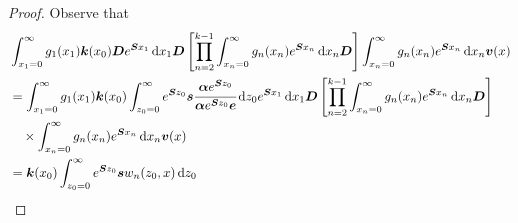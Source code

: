 \begin{proof}
	Observe that 
	\begin{align}
		\nonumber&\int_{x_1=0}^\infty g_1(x_1) \boldsymbol k(x_0) \boldsymbol D e^{\boldsymbol{S}x_1}\, \mathrm{d} x_1\boldsymbol D 
            	\left[\prod_{n=2}^{k-1}\int_{x_n=0}^\infty g_n(x_n) e^{\boldsymbol{S}x_n} \, \mathrm{d} x_n
		\boldsymbol D\right]
            	\int_{x_n=0}^\infty g_{n}(x_n) e^{\boldsymbol{S}x_n} \, \mathrm{d} x_n {\boldsymbol v}(x) 
		\\\nonumber&=\int_{x_1=0}^\infty g_1(x_1) \boldsymbol k(x_0) \int_{z_0=0}^\infty e^{\boldsymbol Sz_0}\boldsymbol s\cfrac{\boldsymbol\alpha e^{\boldsymbol Sz_0}}{\boldsymbol\alpha e^{\boldsymbol Sz_0}\boldsymbol e} \, \mathrm{d} z_0 e^{\boldsymbol{S}x_1}\, \mathrm{d} x_1\boldsymbol D 
            	\left[\prod_{n=2}^{k-1}\int_{x_n=0}^\infty g_n(x_n) e^{\boldsymbol{S}x_n} \, \mathrm{d} x_n
		\boldsymbol D\right]
            	\\\nonumber&\quad\times\int_{x_n=0}^\infty g_{n}(x_n) e^{\boldsymbol{S}x_n} \, \mathrm{d} x_n {\boldsymbol v}(x) 
		\\&=\boldsymbol k(x_0) \int_{z_0=0}^\infty e^{\boldsymbol Sz_0}\boldsymbol sw_n(z_0,x)\, \mathrm{d} z_0
	\end{align}
	

\end{proof}
